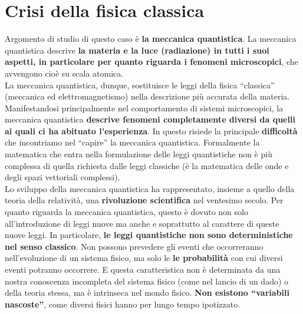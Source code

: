 \documentclass[a4paper,12pt,oneside]{book}
\newcommand*{\myfont}{\fontfamily{ppl}\selectfont}
\begin{document}
\fancypagestyle{plain}{%
\fancyhf{} %
\fancyfoot[C]{\bfseries \myfont{\thepage}} %
\renewcommand{\headrulewidth}{0pt}
\renewcommand{\footrulewidth}{0pt}}

\fancypagestyle{VS}{
\headheight = 15pt
\lhead[\myfont{\textit{\textbf{\thechapter\nouppercase{\leftmark}}}}]{\myfont{\textit{\textbf{\nouppercase{\leftmark}}}}}
\chead[]{}
\rhead[\myfont{\textbf{\thepage}}]{\myfont{\textbf{\thepage}}}

\lfoot[]{}
\cfoot[]{}
\rfoot[]{}
}



\pagestyle{VS}
\chapter{Crisi della fisica classica}
Argomento di studio di questo caso è \textbf{la meccanica quantistica}. La meccanica quantistica descrive \textbf{la materia e la luce (radiazione) in tutti i suoi aspetti, in particolare per quanto riguarda i fenomeni microscopici}, che avvengono cioè su scala atomica.\\

La meccanica quantistica, dunque, sostituisce le leggi della fisica ``classica'' (meccanica ed elettromagnetismo) nella descrizione più accurata della materia. Manifestandosi principalmente nel comportamento di sistemi microscopici, la meccanica quantistica \textbf{descrive fenomeni completamente diversi da quelli ai quali ci ha abituato l'esperienza}. In questo risiede la principale \textbf{difficoltà} che incontriamo nel ``capire'' la meccanica quantistica. Formalmente la matematica che entra nella formulazione delle leggi quantistiche non è più complessa di quella richiesta dalle leggi classiche (è la matematica delle onde e degli spazi vettoriali complessi).\\

Lo sviluppo della meccanica quantistica ha rappresentato, insieme a quello della teoria della relatività, una \textbf{rivoluzione scientifica} nel ventesimo secolo. Per quanto riguarda la meccanica quantistica, questo è dovuto non solo all'introduzione di leggi nuove ma anche e soprattutto al carattere di queste nuove leggi. In particolare, \textbf{le leggi quantistiche non sono deterministiche nel senso classico}. Non possono prevedere gli eventi che occorreranno nell'evoluzione di un sistema fisico, ma solo le \textbf{le probabilità} con cui diversi eventi potranno occorrere. E questa caratteristica non è determinata da una nostra conoscenza incompleta del sistema fisico (come nel lancio di un dado) o della teoria stessa, ma è intrinseca nel mondo fisico. \textbf{Non esistono ``variabili nascoste''}, come diversi fisici hanno per lungo tempo ipotizzato.\\
\end{document}
